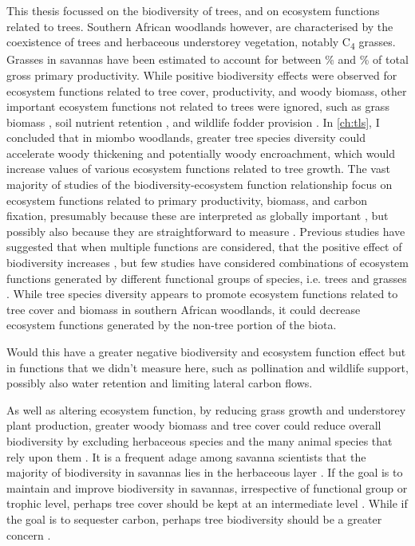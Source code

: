 \begin{refsection}
This thesis focussed on the biodiversity of trees, and on ecosystem functions related to trees. Southern African woodlands however, are characterised by the coexistence of trees and herbaceous understorey vegetation, notably C\textsubscript{4} grasses. Grasses in savannas have been estimated to account for between \% \citep{} and \% \citep{} of total gross primary productivity. While positive biodiversity effects were observed for ecosystem functions related to tree cover, productivity, and woody biomass, other important ecosystem functions not related to trees were ignored, such as grass biomass \citep{}, soil nutrient retention \citep{}, and wildlife fodder provision \citep{}. In \autoref{ch:tls}, I concluded that in miombo woodlands, greater tree species diversity could accelerate woody thickening and potentially woody encroachment, which would increase values of various ecosystem functions related to tree growth. The vast majority of studies of the biodiversity-ecosystem function relationship focus on ecosystem functions related to primary productivity, biomass, and carbon fixation, presumably because these are interpreted as globally important \citep{}, but possibly also because they are straightforward to measure \citep{}. Previous studies have suggested that when multiple functions are considered, that the positive effect of biodiversity increases \citep{Hector2007}, but few studies have considered combinations of ecosystem functions generated by different functional groups of species, i.e. trees and grasses \citep{}. While tree species diversity appears to promote ecosystem functions related to tree cover and biomass in southern African woodlands, it could decrease ecosystem functions generated by the non-tree portion of the biota. 

Would this have a greater negative biodiversity and ecosystem function effect but in functions that we didn't measure here, such as pollination and wildlife support, possibly also water retention and limiting lateral carbon flows.

As well as altering ecosystem function, by reducing grass growth and understorey plant production, greater woody biomass and tree cover could reduce overall biodiversity by excluding herbaceous species and the many animal species that rely upon them \citep{}. It is a frequent adage among savanna scientists that the majority of biodiversity in savannas lies in the herbaceous layer \citep{}. If the goal is to maintain and improve biodiversity in savannas, irrespective of functional group or trophic level, perhaps tree cover should be kept at an intermediate level \citep{}. While if the goal is to sequester carbon, perhaps tree biodiversity should be a greater concern \citep{}.




\end{refsection}
